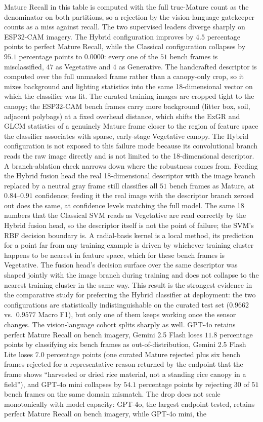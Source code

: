 Mature Recall in this table is computed with the full true-Mature count as the denominator on both partitions, so a rejection by the vision-language gatekeeper counts as a miss against recall. The two supervised leaders diverge sharply on ESP32-CAM imagery. The Hybrid configuration improves by $4.5$ percentage points to perfect Mature Recall, while the Classical configuration collapses by $95.1$ percentage points to $0.0000$: every one of the $51$ bench frames is misclassified, $47$ as Vegetative and $4$ as Generative. The handcrafted descriptor is computed over the full unmasked frame rather than a canopy-only crop, so it mixes background and lighting statistics into the same 18-dimensional vector on which the classifier was fit. The curated training images are cropped tight to the canopy; the ESP32-CAM bench frames carry more background (litter box, soil, adjacent polybags) at a fixed overhead distance, which shifts the ExGR and GLCM statistics of a genuinely Mature frame closer to the region of feature space the classifier associates with sparse, early-stage Vegetative canopy. The Hybrid configuration is not exposed to this failure mode because its convolutional branch reads the raw image directly and is not limited to the 18-dimensional descriptor. A branch-ablation check narrows down where the robustness comes from. Feeding the Hybrid fusion head the real 18-dimensional descriptor with the image branch replaced by a neutral gray frame still classifies all $51$ bench frames as Mature, at $0.84$--$0.91$ confidence; feeding it the real image with the descriptor branch zeroed out does the same, at confidence levels matching the full model. The same 18 numbers that the Classical SVM reads as Vegetative are read correctly by the Hybrid fusion head, so the descriptor itself is not the point of failure; the SVM's RBF decision boundary is. A radial-basis kernel is a local method, its prediction for a point far from any training example is driven by whichever training cluster happens to be nearest in feature space, which for these bench frames is Vegetative. The fusion head's decision surface over the same descriptor was shaped jointly with the image branch during training and does not collapse to the nearest training cluster in the same way. This result is the strongest evidence in the comparative study for preferring the Hybrid classifier at deployment: the two configurations are statistically indistinguishable on the curated test set ($0.9662$ vs.\ $0.9577$ Macro F1), but only one of them keeps working once the sensor changes. The vision-language cohort splits sharply as well. GPT-4o retains perfect Mature Recall on bench imagery, Gemini 2.5 Flash loses $11.8$ percentage points by classifying six bench frames as out-of-distribution, Gemini 2.5 Flash Lite loses $7.0$ percentage points (one curated Mature rejected plus six bench frames rejected for a representative reason returned by the endpoint that the frame shows ``harvested or dried rice material, not a standing rice canopy in a field''), and GPT-4o mini collapses by $54.1$ percentage points by rejecting $30$ of $51$ bench frames on the same domain mismatch. The drop does not scale monotonically with model capacity: GPT-4o, the largest endpoint tested, retains perfect Mature Recall on bench imagery, while GPT-4o mini, the 